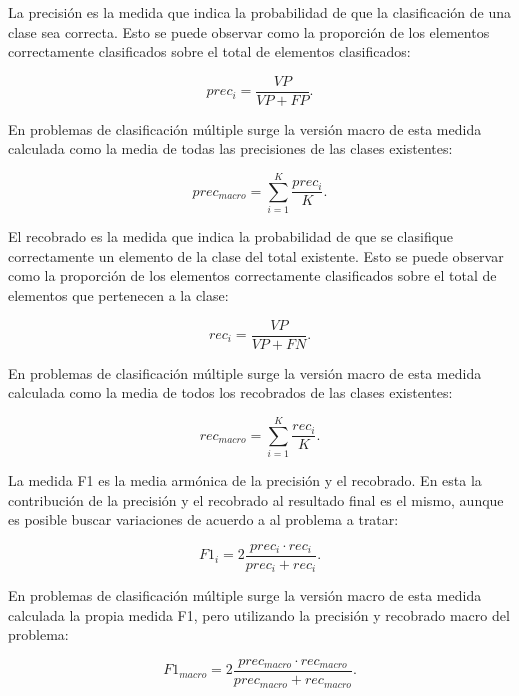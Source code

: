 \documentclass[a4paper,11pt,twocolumn,twoside]{article}
\begin{document}
La precisión es la medida que indica la probabilidad de que la clasificación de una clase sea correcta. Esto 
se puede observar como la proporción de los elementos correctamente clasificados sobre el total de 
elementos clasificados:

\begin{equation}
	prec_i = \frac{VP}{VP + FP}.
\end{equation}

En problemas de clasificación múltiple surge la versión macro de esta medida calculada como la media de todas
las precisiones de las clases existentes:

\begin{equation}
	prec_{macro} = \sum^K_{i=1} \frac{prec_i}{K}.
\end{equation}

El recobrado es la medida que indica la probabilidad de que se clasifique correctamente un elemento de la clase
del total existente. Esto se puede observar como la proporción de los elementos correctamente clasificados sobre el 
total de elementos que pertenecen a la clase:

\begin{equation}
	rec_i = \frac{VP}{VP + FN}.
\end{equation}

En problemas de clasificación múltiple surge la versión macro de esta medida calculada como la media de todos
los recobrados de las clases existentes:

\begin{equation}
	rec_{macro} = \sum^K_{i=1} \frac{rec_i}{K}.
\end{equation}

La medida F1 es la media armónica de la precisión y el recobrado. En esta la contribución de la precisión y el
recobrado al resultado final es el mismo, aunque es posible buscar variaciones de acuerdo a al problema a tratar:

\begin{equation}
	F1_i = 2 \frac{prec_i \cdot rec_i}{prec_i + rec_i}.
\end{equation}

En problemas de clasificación múltiple surge la versión macro de esta medida calculada la propia medida F1, pero
utilizando la precisión y recobrado macro del problema:

\begin{equation}
	F1_{macro} = 2 \frac{prec_{macro} \cdot rec_{macro}}{prec_{macro} + rec_{macro}}.
\end{equation}
\end{document}

